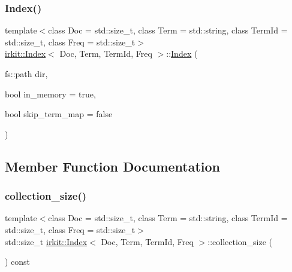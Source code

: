 \subsubsection{\texorpdfstring{Index()}{Index()}\hspace{0.1cm}{\footnotesize\ttfamily [2/2]}}
{\footnotesize\ttfamily template$<$class Doc  = std\+::size\+\_\+t, class Term  = std\+::string, class Term\+Id  = std\+::size\+\_\+t, class Freq  = std\+::size\+\_\+t$>$ \\
\hyperlink{classirkit_1_1Index}{irkit\+::\+Index}$<$ Doc, Term, Term\+Id, Freq $>$\+::\hyperlink{classirkit_1_1Index}{Index} (\begin{DoxyParamCaption}\item[{fs\+::path}]{dir,  }\item[{bool}]{in\+\_\+memory = {\ttfamily true},  }\item[{bool}]{skip\+\_\+term\+\_\+map = {\ttfamily false} }\end{DoxyParamCaption})\hspace{0.3cm}{\ttfamily [inline]}}



\subsection{Member Function Documentation}
\mbox{\label{classirkit_1_1Index_a45ede4e9e43c8a813d13467d97c084a1}} 
\subsubsection{\texorpdfstring{collection\+\_\+size()}{collection\_size()}}
{\footnotesize\ttfamily template$<$class Doc  = std\+::size\+\_\+t, class Term  = std\+::string, class Term\+Id  = std\+::size\+\_\+t, class Freq  = std\+::size\+\_\+t$>$ \\
std\+::size\+\_\+t \hyperlink{classirkit_1_1Index}{irkit\+::\+Index}$<$ Doc, Term, Term\+Id, Freq $>$\+::collection\+\_\+size (\begin{DoxyParamCaption}{ }\end{DoxyParamCaption}) const\hspace{0.3cm}{\ttfamily [inline]}}

\mbox{\label{classirkit_1_1Index_a47d88bb03c2c547fc159739b13871f68}} 
